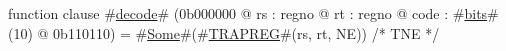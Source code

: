 function clause #\hyperref[zdecode]{decode}# (0b000000 @ rs : regno @ rt : regno @ code : #\hyperref[zbits]{bits}#(10) @ 0b110110) =
  #\hyperref[zSome]{Some}#(#\hyperref[zTRAPREG]{TRAPREG}#(rs, rt, NE)) /* TNE */
